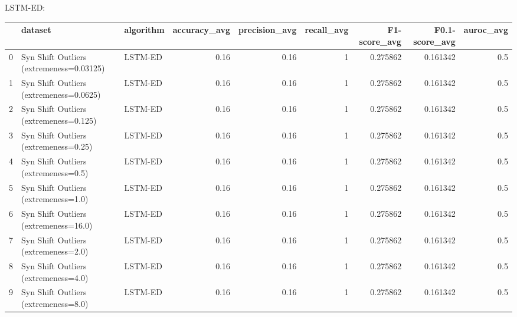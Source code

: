 LSTM-ED:

\begin{tabular}{rllrrrrrr}
\hline
    & dataset                                  & algorithm   &   accuracy\_avg &   precision\_avg &   recall\_avg &   F1-score\_avg &   F0.1-score\_avg &   auroc\_avg \\
\hline
  0 & Syn Shift Outliers (extremeness=0.03125) & LSTM-ED     &           0.16 &            0.16 &            1 &       0.275862 &         0.161342 &         0.5 \\
  1 & Syn Shift Outliers (extremeness=0.0625)  & LSTM-ED     &           0.16 &            0.16 &            1 &       0.275862 &         0.161342 &         0.5 \\
  2 & Syn Shift Outliers (extremeness=0.125)   & LSTM-ED     &           0.16 &            0.16 &            1 &       0.275862 &         0.161342 &         0.5 \\
  3 & Syn Shift Outliers (extremeness=0.25)    & LSTM-ED     &           0.16 &            0.16 &            1 &       0.275862 &         0.161342 &         0.5 \\
  4 & Syn Shift Outliers (extremeness=0.5)     & LSTM-ED     &           0.16 &            0.16 &            1 &       0.275862 &         0.161342 &         0.5 \\
  5 & Syn Shift Outliers (extremeness=1.0)     & LSTM-ED     &           0.16 &            0.16 &            1 &       0.275862 &         0.161342 &         0.5 \\
  6 & Syn Shift Outliers (extremeness=16.0)    & LSTM-ED     &           0.16 &            0.16 &            1 &       0.275862 &         0.161342 &         0.5 \\
  7 & Syn Shift Outliers (extremeness=2.0)     & LSTM-ED     &           0.16 &            0.16 &            1 &       0.275862 &         0.161342 &         0.5 \\
  8 & Syn Shift Outliers (extremeness=4.0)     & LSTM-ED     &           0.16 &            0.16 &            1 &       0.275862 &         0.161342 &         0.5 \\
  9 & Syn Shift Outliers (extremeness=8.0)     & LSTM-ED     &           0.16 &            0.16 &            1 &       0.275862 &         0.161342 &         0.5 \\
\hline
\end{tabular}

